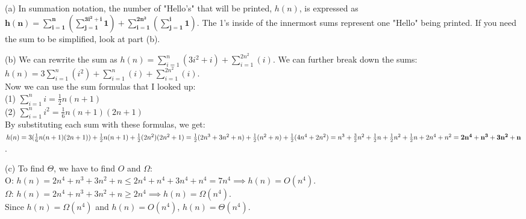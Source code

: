 \documentclass[11pt]{article}
\begin{document}
\begin{solution}

\begin{description}
\item{(a)} In summation notation, the number of "Hello's" that will be printed, $h(n)$, is expressed as $\mathbf{h(n)=\sum_{i=1}^{n}(\sum_{j=1}^{3i^2+i}1) + \sum_{i=1}^{2n^2}(\sum_{j=1}^{i}1)}$. The 1's inside of the innermost sums represent one "Hello" being printed. If you need the sum to be simplified, look at part (b).

\item{(b)} We can rewrite the sum as $h(n)=\sum_{i=1}^{n}(3i^2+i) + \sum_{i=1}^{2n^2}(i)$. We can further break down the sums: \\ $h(n)=3\sum_{i=1}^{n}(i^2) + \sum_{i=1}^{n}(i) + \sum_{i=1}^{2n^2}(i)$. 
\\ Now we can use the sum formulas that I looked up: 
\\ \text{       }(1) $\sum_{i=1}^{n}i = \frac{1}{2}n(n+1)$
\\ \text{       }(2) $\sum_{i=1}^{n}i^2 = \frac{1}{6}n(n+1)(2n+1)$
\\ By substituting each sum with these formulas, we get:
\\ $h(n) = 3(\frac{1}{6}n(n+1)(2n+1)) + \frac{1}{2}n(n+1) + \frac{1}{2}(2n^2)(2n^2+1) \\=
\frac{1}{2}(2n^3+3n^2+n) + \frac{1}{2}(n^2+n)+\frac{1}{2}(4n^4+2n^2)
= n^3 + \frac{3}{2}n^2 + \frac{1}{2}n + \frac{1}{2}n^2 + \frac{1}{2}n + 2n^4 + n^2
\\ = \mathbf{2n^4 + n^3 + 3n^2 + n}$.

\item{(c)}
To find $\Theta$, we have to find $O$ and $\Omega$: 
\\ O: $h(n) = 2n^4 + n^3 + 3n^2 + n \leq 2n^4 + n^4 + 3n^4 + n^4 = 7n^4 \implies h(n) = O(n^4)$.
\\ $\Omega$: $h(n) = 2n^4 + n^3 + 3n^2 + n \geq 2n^4 \implies h(n) = \Omega (n^4)$. 
\\ Since $h(n) = \Omega(n^4)$ and $h(n) = O(n^4)$, $h(n) = \Theta(n^4)$.



\end{description}
\end{solution}


\newpage
\end{document}
